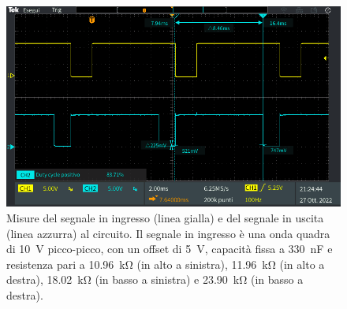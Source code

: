 \begin{figure}[h]
\begin{minipage}{.496\textwidth}
	\end{minipage}
	\begin{minipage}{.496\textwidth}
		\includegraphics[width=\linewidth]{./ImageFiles/Laboratorio 4/TEK00019.PNG}
	\end{minipage}
	\caption{Misure del segnale in ingresso (linea gialla) e del segnale in uscita (linea azzurra) al circuito. Il segnale in ingresso è una onda quadra di \SI{10}{\volt} picco-picco, con un offset di \SI{5}{\volt}, capacità fissa a \SI{330}{\nano\farad} e resistenza pari a \SI{10,96}{\kilo\ohm} (in alto a sinistra), \SI{11,96}{\kilo\ohm} (in alto a destra), \SI{18,02}{\kilo\ohm} (in basso a sinistra) e \SI{23,90}{\kilo\ohm} (in basso a destra).}
	\label{fig:uscita_circuito_330n}
\end{figure}
